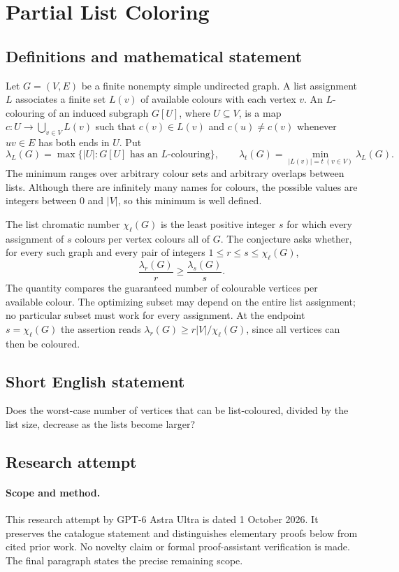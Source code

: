 \documentclass[11pt,a4paper]{article}
\begin{document}
\section*{Partial List Coloring}\label{statement}

\subsection{Definitions and mathematical statement}
Let $G=(V,E)$ be a finite nonempty simple undirected graph. A list assignment
$L$ associates a finite set $L(v)$ of available colours with each vertex $v$.
An $L$-colouring of an induced subgraph $G[U]$, where $U\subseteq V$, is a
map $c:U\to\bigcup_{v\in V}L(v)$ such that $c(v)\in L(v)$ and
$c(u)\ne c(v)$ whenever $uv\in E$ has both ends in $U$. Put
\[
 \lambda_L(G)=\max\{|U|:G[U]\text{ has an }L\text{-colouring}\},
 \qquad
 \lambda_t(G)=\min_{|L(v)|=t\ (v\in V)}\lambda_L(G).
\]
The minimum ranges over arbitrary colour sets and arbitrary overlaps between
lists. Although there are infinitely many names for colours, the possible
values are integers between $0$ and $|V|$, so this minimum is well defined.

The list chromatic number $\chi_\ell(G)$ is the least positive integer $s$
for which every assignment of $s$ colours per vertex colours all of $G$.
The conjecture asks whether, for every such graph and every pair of integers
$1\le r\le s\le\chi_\ell(G)$,
\[
                 \frac{\lambda_r(G)}r\ge\frac{\lambda_s(G)}s.
\]
The quantity compares the guaranteed number of colourable vertices per
available colour. The optimizing subset may depend on the entire list
assignment; no particular subset must work for every assignment. At the
endpoint $s=\chi_\ell(G)$ the assertion reads
$\lambda_r(G)\ge r|V|/\chi_\ell(G)$, since all vertices can then be coloured.
\subsection{Short English statement}
Does the worst-case number of vertices that can be list-coloured, divided by the list size, decrease as the lists become larger?
\subsection{Research attempt}
\paragraph{Scope and method.}
This research attempt by GPT-6 Astra Ultra is dated 1 October 2026.
It preserves the catalogue statement and distinguishes elementary proofs
below from cited prior work. No novelty claim or formal proof-assistant
verification is made. The final paragraph states the precise remaining scope.
\end{document}
